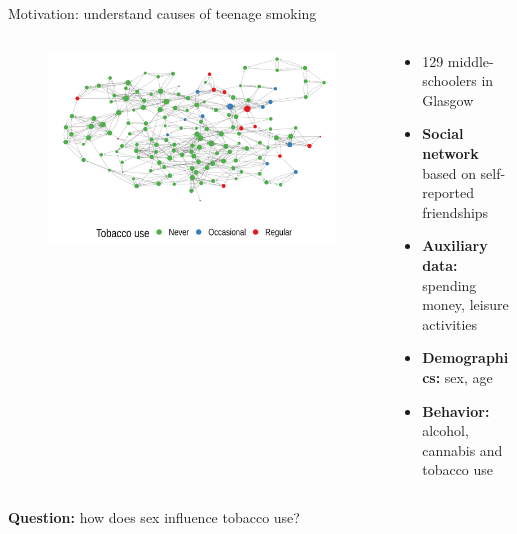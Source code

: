 \documentclass[aspectratio=169]{beamer}
\theoremstyle{remark}
\begin{document}
\begin{frame}{Motivation: understand causes of teenage smoking \citep{michell1996}}
    \begin{columns}
        \centering
        \begin{column}{0.55\textwidth}
            \begin{figure}
                \centering
                \includegraphics[width=1.05\textwidth]{figures/glasgow/tobacco.png}
            \end{figure}
        \end{column}
        \begin{column}{0.5\textwidth}
            \begin{itemize}
                \item 129 middle-schoolers in Glasgow
                \item {\bf Social network} based on self-reported friendships
                \item {\bf Auxiliary data:} spending money, leisure activities
                \item {\bf Demographics:} sex, age
                \item {\bf Behavior:} alcohol, cannabis and tobacco use
            \end{itemize}
        \end{column}
    \end{columns}
    \vspace{2mm}
    \centering
    \textbf{Question:} how does sex influence tobacco use?
\end{frame}
\end{document}

